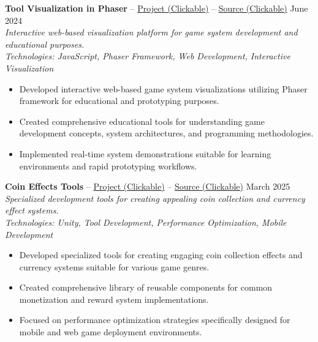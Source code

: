 \documentclass[a4paper,10pt]{article}
\begin{document}
\textbf{Tool Visualization in Phaser} -- \href{https://assayyaad.itch.io/anthima-phaser}{Project (Clickable)} -- \href{https://github.com/Anthima-Alaab/JavaScript}{Source (Clickable)} \hfill June 2024\\
\textit{Interactive web-based visualization platform for game system development and educational purposes.}\\
\textit{Technologies: JavaScript, Phaser Framework, Web Development, Interactive Visualization}
\begin{itemize}[nosep]
    \item Developed interactive web-based game system visualizations utilizing Phaser framework for educational and prototyping purposes.
    \item Created comprehensive educational tools for understanding game development concepts, system architectures, and programming methodologies.
    \item Implemented real-time system demonstrations suitable for learning environments and rapid prototyping workflows.
\end{itemize}

\addvspace{\medskipamount}

\textbf{Coin Effects Tools} -- \href{https://assayyaad.itch.io/riyal-coin}{Project (Clickable)} -- \href{https://gitlab.com/Assayyaad/Riyal-Coin}{Source (Clickable)} \hfill March 2025\\
\textit{Specialized development tools for creating appealing coin collection and currency effect systems.}\\
\textit{Technologies: Unity, Tool Development, Performance Optimization, Mobile Development}
\begin{itemize}[nosep]
    \item Developed specialized tools for creating engaging coin collection effects and currency systems suitable for various game genres.
    \item Created comprehensive library of reusable components for common monetization and reward system implementations.
    \item Focused on performance optimization strategies specifically designed for mobile and web game deployment environments.
\end{itemize}

\addvspace{\medskipamount}
\end{document}
